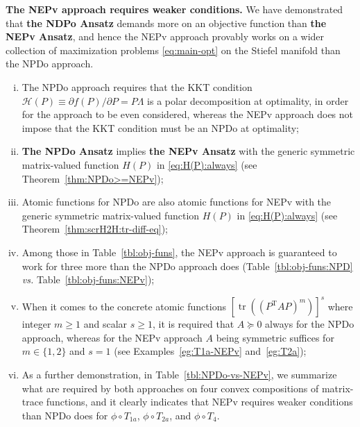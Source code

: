 \documentclass[11pt]{article}
\def\scrH{\mathscr{H}}
\DeclareMathOperator{\tr}{tr}
\DeclareMathOperator{\T}{T}
\theoremstyle{definition}
\numberwithin{equation}{section}
\begin{document}

\smallskip
{\bf The NEPv approach requires weaker conditions.}
We have
demonstrated that {\bf the NDPo Ansatz} demands more on an objective function than {\bf the NEPv Ansatz}, and hence
the NEPv approach provably works on a wider collection of maximization problems \eqref{eq:main-opt} on the Stiefel manifold
than the NPDo approach.
\begin{enumerate}[(i)]
  \item The NPDo approach requires that the KKT
        condition $\scrH(P)\equiv{\partial f(P)}/{\partial P}=P\Lambda$
        is a polar decomposition at optimality, in order for the approach to be even considered,
        whereas the NEPv approach does not impose that
        the KKT condition must be an NPDo at optimality;
  \item {\bf The NPDo Ansatz} implies {\bf the NEPv Ansatz} with the generic symmetric matrix-valued function $H(P)$ in \eqref{eq:H(P):always} (see Theorem~\ref{thm:NPDo>=NEPv});
  \item Atomic functions for NPDo are also atomic functions for NEPv  with the generic symmetric matrix-valued function $H(P)$ in \eqref{eq:H(P):always} (see Theorem~\ref{thm:scrH2H:tr-diff-eq});
  \item Among those in Table~\ref{tbl:obj-funs}, the NEPv approach is guaranteed to work for three more
        than  the NPDo approach does (Table~\ref{tbl:obj-funs:NPD} {\em vs.} Table~\ref{tbl:obj-funs:NEPv});
  \item When it comes to the concrete atomic functions $[\tr((P^{\T}AP)^m)]^s$
        where integer $m\ge 1$ and scalar $s\ge 1$,
        it is required that $A\succeq 0$ always for the NPDo approach, whereas for the NEPv approach $A$ being symmetric
        suffices for $m\in\{1,2\}$ and $s=1$ (see Examples~\ref{eg:T1a-NEPv} and~\ref{eg:T2a});
  \item As a further demonstration, in Table~\ref{tbl:NPDo-vs-NEPv}, we summarize
        what are required by both approaches on four convex compositions of matrix-trace functions, and
        it clearly indicates that NEPv requires weaker conditions than  NPDo does for
        $\phi\circ T_{1a}$, $\phi\circ T_{2a}$, and $\phi\circ T_4$.
\end{enumerate}
\end{document}

